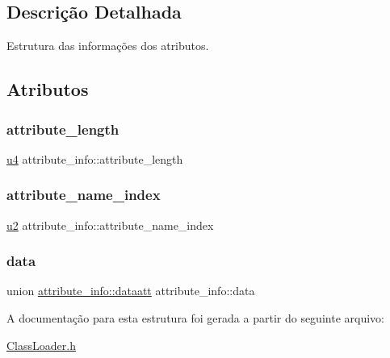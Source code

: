 \subsection{Descrição Detalhada}
Estrutura das informações dos atributos. 

\subsection{Atributos}
\mbox{\label{structattribute__info_a1ed8f679458c4bb0ed3315721588f50d}} 
\subsubsection{\texorpdfstring{attribute\+\_\+length}{attribute\_length}}
{\footnotesize\ttfamily \hyperlink{ClassLoader_8h_aedf6ddc03df8caaaccbb4c60b9a9b850}{u4} attribute\+\_\+info\+::attribute\+\_\+length}

\mbox{\label{structattribute__info_a19df9d4b42eb55ca5dc1bed98df89378}} 
\subsubsection{\texorpdfstring{attribute\+\_\+name\+\_\+index}{attribute\_name\_index}}
{\footnotesize\ttfamily \hyperlink{ClassLoader_8h_a5f223212eef04d10a4550ded680cb1cf}{u2} attribute\+\_\+info\+::attribute\+\_\+name\+\_\+index}

\mbox{\label{structattribute__info_a63cd7230a276bdc8fc0d9eefc730c0db}} 
\subsubsection{\texorpdfstring{data}{data}}
{\footnotesize\ttfamily union \hyperlink{unionattribute__info_1_1dataatt}{attribute\+\_\+info\+::dataatt} attribute\+\_\+info\+::data}



A documentação para esta estrutura foi gerada a partir do seguinte arquivo\+:\begin{DoxyCompactItemize}
\item 
\hyperlink{ClassLoader_8h}{Class\+Loader.\+h}\end{DoxyCompactItemize}
